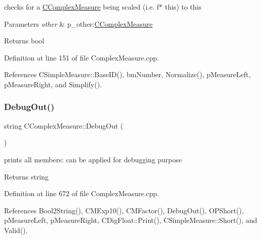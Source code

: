 checks for a \hyperlink{classCComplexMeasure}{C\+Complex\+Measure} being scaled (i.\+e. f$\ast$ this) to this 


\begin{DoxyParams}{Parameters}
{\em other} & p\+\_\+other\+:\hyperlink{classCComplexMeasure}{C\+Complex\+Measure} \\
\hline
\end{DoxyParams}
\begin{DoxyReturn}{Returns}
bool 
\end{DoxyReturn}


Definition at line 151 of file Complex\+Measure.\+cpp.



References C\+Simple\+Measure\+::\+Base\+I\+D(), bm\+Number, Normalize(), p\+Measure\+Left, p\+Measure\+Right, and Simplify().

\mbox{\label{classCComplexMeasure_a83c00029eaad1c0c59fd1210108981dc}} 
\subsubsection{\texorpdfstring{Debug\+Out()}{DebugOut()}}
{\footnotesize\ttfamily string C\+Complex\+Measure\+::\+Debug\+Out (\begin{DoxyParamCaption}{ }\end{DoxyParamCaption})}



prints all members\+: can be applied for debugging purpose 

\begin{DoxyReturn}{Returns}
string 
\end{DoxyReturn}


Definition at line 672 of file Complex\+Measure.\+cpp.



References Bool2\+String(), C\+M\+Exp10(), C\+M\+Factor(), Debug\+Out(), O\+P\+Short(), p\+Measure\+Left, p\+Measure\+Right, C\+Dig\+Float\+::\+Print(), C\+Simple\+Measure\+::\+Short(), and Valid().

\mbox{\label{classCComplexMeasure_a87cc1f3c3f0dafd7cbe00634124c8d46}} 
